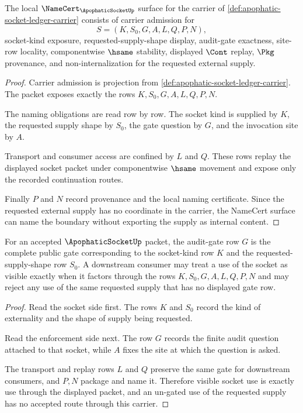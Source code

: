 \begin{theorem}
\label{thm:apophatic-socket-namecert-obligations}
The local $\NameCert_{\ApophaticSocketUp}$ surface for the carrier of \autoref{def:apophatic-socket-ledger-carrier} consists of carrier admission for
$$
S=(K,S_0,G,A,L,Q,P,N),
$$
socket-kind exposure, requested-supply-shape display, audit-gate exactness, site-row locality, componentwise $\hsame$ stability, displayed $\Cont$ replay, $\Pkg$ provenance, and non-internalization for the requested external supply.
\end{theorem}
\begin{proof}
Carrier admission is projection from \autoref{def:apophatic-socket-ledger-carrier}. The packet exposes exactly the rows $K,S_0,G,A,L,Q,P,N$.

The naming obligations are read row by row. The socket kind is supplied by $K$, the requested supply shape by $S_0$, the gate question by $G$, and the invocation site by $A$.

Transport and consumer access are confined by $L$ and $Q$. These rows replay the displayed socket packet under componentwise $\hsame$ movement and expose only the recorded continuation routes.

Finally $P$ and $N$ record provenance and the local naming certificate. Since the requested external supply has no coordinate in the carrier, the NameCert surface can name the boundary without exporting the supply as internal content.
\end{proof}

\begin{theorem}
\label{thm:apophatic-socket-gate-correspondence}
For an accepted $\ApophaticSocketUp$ packet, the audit-gate row $G$ is the complete public gate corresponding to the socket-kind row $K$ and the requested-supply-shape row $S_0$. A downstream consumer may treat a use of the socket as visible exactly when it factors through the rows $K,S_0,G,A,L,Q,P,N$ and may reject any use of the same requested supply that has no displayed gate row.
\end{theorem}
\begin{proof}
Read the socket side first. The rows $K$ and $S_0$ record the kind of externality and the shape of supply being requested.

Read the enforcement side next. The row $G$ records the finite audit question attached to that socket, while $A$ fixes the site at which the question is asked.

The transport and replay rows $L$ and $Q$ preserve the same gate for downstream consumers, and $P,N$ package and name it. Therefore visible socket use is exactly use through the displayed packet, and an un-gated use of the requested supply has no accepted route through this carrier.
\end{proof}

